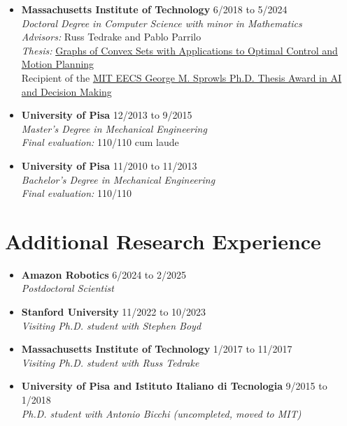 \documentclass[11pt,a4paper,sans,twoside]{moderncv}
\begin{document}
\begin{itemize}

\item \textbf{Massachusetts Institute of Technology} \hfill 6/2018 to 5/2024 \\
\textit{Doctoral Degree in Computer Science with minor in Mathematics} \\
\textit{Advisors:} Russ Tedrake and Pablo Parrilo \\
\textit{Thesis:} \href{https://dspace.mit.edu/handle/1721.1/156598}{\color{cyan}Graphs of Convex Sets with Applications to Optimal Control and Motion Planning} \\
Recipient of the \href{https://www.eecs.mit.edu/eecs-2025-awards/}{\color{cyan}MIT EECS George M. Sprowls Ph.D. Thesis Award in AI and Decision Making}

\item \textbf{University of Pisa} \hfill 12/2013 to 9/2015 \\
\textit{Master's Degree in Mechanical Engineering} \\
\textit{Final evaluation:} 110/110 cum laude

\item \textbf{University of Pisa} \hfill 11/2010 to 11/2013 \\
\textit{Bachelor's Degree in Mechanical Engineering} \\
\textit{Final evaluation:} 110/110
	
\end{itemize}

\section{Additional Research Experience}

\begin{itemize}
	
\item \textbf{Amazon Robotics} \hfill 6/2024 to 2/2025 \\
\textit{Postdoctoral Scientist}

\item \textbf{Stanford University} \hfill 11/2022 to 10/2023 \\
\textit{Visiting Ph.D. student with Stephen Boyd}

\item \textbf{Massachusetts Institute of Technology} \hfill 1/2017 to 11/2017 \\
\textit{Visiting Ph.D. student with Russ Tedrake}

\item \textbf{University of Pisa and Istituto Italiano di Tecnologia} \hfill 9/2015 to 1/2018 \\
\textit{Ph.D. student with Antonio Bicchi (uncompleted, moved to MIT)}

\end{itemize}
\end{document}
